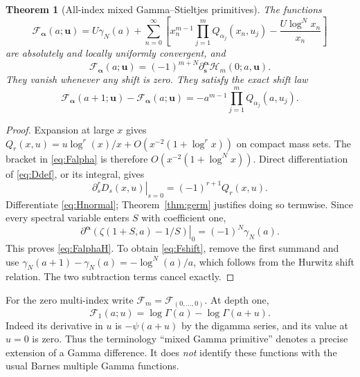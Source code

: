 \documentclass[11pt]{article}
\numberwithin{equation}{section}
\newtheorem{theorem}{Theorem}[section]
\theoremstyle{definition}\newtheorem{definition}[theorem]{Definition}
\theoremstyle{remark}\newtheorem{remark}[theorem]{Remark}
\newcommand{\bs}{\boldsymbol{s}}
\newcommand{\bu}{\boldsymbol{u}}
\newcommand{\ba}{\boldsymbol{\alpha}}
\newcommand{\cH}{\mathcal H}
\newcommand{\cF}{\mathcal F}
\begin{document}
\begin{theorem}[All-index mixed Gamma--Stieltjes primitives]\label{thm:Falpha}
The functions
\begin{equation}\label{eq:Falpha}
 \boxed{\quad
 \cF_{\ba}(a;\bu)=U\gamma_N(a)+
 \sum_{n=0}^{\infty}\left[
 x_n^{m-1}\prod_{j=1}^m Q_{\alpha_j}(x_n,u_j)
 -\frac{U\log^N x_n}{x_n}\right]\quad}
\end{equation}
are absolutely and locally uniformly convergent, and
\begin{equation}\label{eq:FalphaH}
 \cF_{\ba}(a;\bu)=(-1)^{m+N}\partial^{\ba}_{\bs}\cH_m(0;a,\bu).
\end{equation}
They vanish whenever any shift is zero. They satisfy the exact shift law
\begin{equation}\label{eq:Fshift}
 \cF_{\ba}(a+1;\bu)-\cF_{\ba}(a;\bu)
 =-a^{m-1}\prod_{j=1}^mQ_{\alpha_j}(a,u_j).
\end{equation}
\end{theorem}
\begin{proof}
Expansion at large $x$ gives
$Q_r(x,u)=u\log^r(x)/x+O(x^{-2}(1+\log^r x))$ on compact mass sets. The bracket in \eqref{eq:Falpha} is therefore $O(x^{-2}(1+\log^N x))$.
Direct differentiation of \eqref{eq:Ddef}, or its integral, gives
\[
 \left.\partial_s^rD_s(x,u)\right|_{s=0}=(-1)^{r+1}Q_r(x,u).
\]
Differentiate \eqref{eq:Hnormal}; Theorem~\ref{thm:germ} justifies doing so termwise. Since every spectral variable enters $S$ with coefficient one,
\[
 \left.\partial^{\ba}\left(\zeta(1+S,a)-1/S\right)\right|_0
 =(-1)^N\gamma_N(a).
\]
This proves \eqref{eq:FalphaH}. To obtain \eqref{eq:Fshift}, remove the first summand and use
$\gamma_N(a+1)-\gamma_N(a)=-\log^N(a)/a$, which follows from the Hurwitz shift relation. The two subtraction terms cancel exactly.
\end{proof}

For the zero multi-index write $\cF_m=\cF_{(0,\ldots,0)}$. At depth one,
\begin{equation}\label{eq:depthone}
 \cF_1(a;u)=\log\Gamma(a)-\log\Gamma(a+u).
\end{equation}
Indeed its derivative in $u$ is $-\psi(a+u)$ by the digamma series, and its value at $u=0$ is zero. Thus the terminology ``mixed Gamma primitive'' denotes a precise extension of a Gamma difference. It does \emph{not} identify these functions with the usual Barnes multiple Gamma functions.
\end{document}
